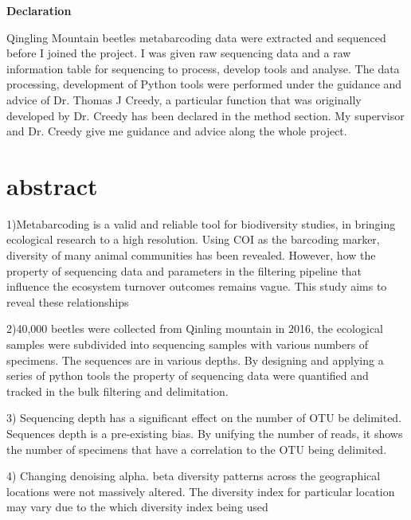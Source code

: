 \documentclass[11pt, a4paper]{article}
\date{August 2020}
\begin{document}



\clearpage{\pagestyle{empty}\cleardoublepage}
\setcounter{page}{1}
\pagestyle{fancy}

\large\textbf{Declaration}

Qingling Mountain beetles metabarcoding data were extracted and sequenced before I joined the project.
I was given raw sequencing data and a raw information table for sequencing to process, develop tools and analyse. 
The data processing, development of Python tools were performed under the guidance and advice of Dr. Thomas J Creedy, a particular function that was originally developed by Dr. Creedy has been declared in the method section. 
My supervisor and Dr. Creedy give me guidance and advice along the whole project.

\section{abstract}
1)Metabarcoding is a valid and reliable tool for biodiversity studies, in bringing ecological research to a high resolution. Using COI as the barcoding marker, diversity of many animal communities has been revealed. However,  how the property of sequencing data and parameters in the filtering pipeline that influence the ecosystem turnover outcomes remains vague. This study aims to reveal these relationships

2)40,000 beetles were collected from Qinling mountain in 2016, the ecological samples were subdivided into sequencing samples with various numbers of specimens. The sequences are in various depths. By designing and applying a series of python tools the property of sequencing data were quantified and tracked in the bulk filtering and delimitation.

3) Sequencing depth has a significant effect on the number of OTU be delimited. Sequences depth is a pre-existing bias. By unifying the number of reads, it shows the number of specimens that have a correlation to the OTU being delimited.

4) Changing denoising alpha. beta diversity patterns across the geographical locations were not massively altered. The diversity index for particular location may vary due to the which diversity index being used



\end{document}
